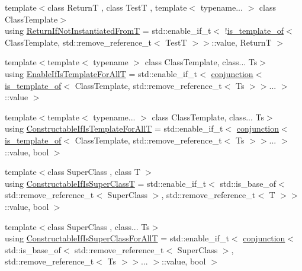 \begin{DoxyCompactItemize}
\item 
{\footnotesize template$<$class ReturnT , class TestT , template$<$ typename... $>$ class Class\+Template$>$ }\\using \hyperlink{namespaceprior__hessian_1_1meta_aea50a7973fa87d00d93e526c23d14549}{Return\+If\+Not\+Instantiated\+FromT} = std\+::enable\+\_\+if\+\_\+t$<$ !\hyperlink{structprior__hessian_1_1meta_1_1is__template__of}{is\+\_\+template\+\_\+of}$<$ Class\+Template, std\+::remove\+\_\+reference\+\_\+t$<$ TestT $>$$>$\+::value, ReturnT $>$
\item 
{\footnotesize template$<$template$<$ typename $>$ class Class\+Template, class... Ts$>$ }\\using \hyperlink{namespaceprior__hessian_1_1meta_a6c1ba653f64db9c1887e74c50ab257b1}{Enable\+If\+Is\+Template\+For\+AllT} = std\+::enable\+\_\+if\+\_\+t$<$ \hyperlink{structprior__hessian_1_1meta_1_1conjunction}{conjunction}$<$ \hyperlink{structprior__hessian_1_1meta_1_1is__template__of}{is\+\_\+template\+\_\+of}$<$ Class\+Template, std\+::remove\+\_\+reference\+\_\+t$<$ Ts $>$$>$... $>$\+::value $>$
\item 
{\footnotesize template$<$template$<$ typename... $>$ class Class\+Template, class... Ts$>$ }\\using \hyperlink{namespaceprior__hessian_1_1meta_a48175b9bfd69aa8a555323c758403a62}{Constructable\+If\+Is\+Template\+For\+AllT} = std\+::enable\+\_\+if\+\_\+t$<$ \hyperlink{structprior__hessian_1_1meta_1_1conjunction}{conjunction}$<$ \hyperlink{structprior__hessian_1_1meta_1_1is__template__of}{is\+\_\+template\+\_\+of}$<$ Class\+Template, std\+::remove\+\_\+reference\+\_\+t$<$ Ts $>$$>$... $>$\+::value, bool $>$
\item 
{\footnotesize template$<$class Super\+Class , class T $>$ }\\using \hyperlink{namespaceprior__hessian_1_1meta_ac41c6affb6f4ae3fb6ea0abd23a3b10d}{Constructable\+If\+Is\+Super\+ClassT} = std\+::enable\+\_\+if\+\_\+t$<$ std\+::is\+\_\+base\+\_\+of$<$ std\+::remove\+\_\+reference\+\_\+t$<$ Super\+Class $>$, std\+::remove\+\_\+reference\+\_\+t$<$ T $>$$>$\+::value, bool $>$
\item 
{\footnotesize template$<$class Super\+Class , class... Ts$>$ }\\using \hyperlink{namespaceprior__hessian_1_1meta_a4e077ce0021239d133049cf40e8f163e}{Constructable\+If\+Is\+Super\+Class\+For\+AllT} = std\+::enable\+\_\+if\+\_\+t$<$ \hyperlink{structprior__hessian_1_1meta_1_1conjunction}{conjunction}$<$ std\+::is\+\_\+base\+\_\+of$<$ std\+::remove\+\_\+reference\+\_\+t$<$ Super\+Class $>$, std\+::remove\+\_\+reference\+\_\+t$<$ Ts $>$$>$... $>$\+::value, bool $>$
$$
\end{DoxyCompactItemize}
